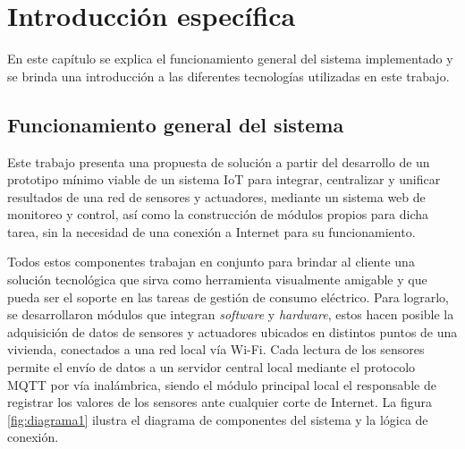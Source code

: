 \chapter{Introducción específica} %

\label{Chapter2}


En este capítulo se explica el funcionamiento general del sistema implementado y se brinda una introducción a las diferentes tecnologías utilizadas en este trabajo.

\section{Funcionamiento general del sistema}

Este trabajo presenta una propuesta de solución a partir del desarrollo de un prototipo mínimo viable de un sistema IoT para integrar, centralizar y unificar resultados de una red de sensores y actuadores, mediante un sistema web de monitoreo y control, así como la construcción de módulos propios para dicha tarea, sin la necesidad de una conexión a Internet para su funcionamiento. 

Todos estos componentes trabajan en conjunto para brindar al cliente una solución tecnológica que sirva como herramienta visualmente amigable y que pueda ser el soporte en las tareas de gestión de consumo eléctrico. Para lograrlo, se desarrollaron módulos que integran \emph{software} y \emph{hardware}, estos hacen posible la adquisición de datos de sensores y actuadores ubicados en distintos puntos de una vivienda, conectados a una red local vía Wi-Fi. Cada lectura de los sensores permite el envío de datos a un servidor central local mediante el protocolo MQTT por vía inalámbrica, siendo el módulo principal local el responsable de registrar los valores de los sensores ante cualquier corte de Internet. La figura \ref{fig:diagrama1} ilustra el diagrama de componentes del sistema y la lógica de conexión.

